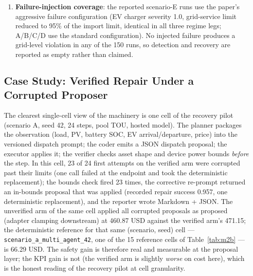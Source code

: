 \documentclass[11pt,a4paper]{article}
\begin{document}
\begin{enumerate}
    item of the authoring corpus (c07) passes because a Singapore weather
    file is resolvable in the environment
    (\texttt{data/weather\_files/singapore.csv}, 8{,}761 hourly rows in
    CityLearn format). That file is a synthetic tropical profile authored for
    this acceptance test, not measured data: no measured Singapore weather
    ships with the CityLearn datasets in this environment (each dataset
    carries one weather.csv). The item is reported as passing on synthetic
    data with the provenance disclosed in the artifact's README, and the
    authoring-acceptance coverage is all 8 domains accordingly; the weather
    token is a resolvable synthetic stand-in, not measured coverage.
    \item \textbf{Failure-injection coverage}: the reported scenario-E runs use the paper's aggressive failure configuration (EV charger severity 1.0, grid-service limit reduced to 95\% of the import limit, identical in all three regime legs; A/B/C/D use the standard configuration). No injected failure produces a grid-level violation in any of the 150 runs, so detection and recovery are reported as empty rather than claimed.
\end{enumerate}

\subsection{Case Study: Verified Repair Under a Corrupted Proposer}
\label{sec:case}

The clearest single-cell view of the machinery is one cell of the recovery
pilot (scenario A, seed 42, 24 steps, pool TOU, hosted model). The planner
packages the observation (load, PV, battery SOC, EV arrival/departure, price)
into the versioned dispatch prompt; the coder emits a JSON dispatch proposal;
the executor applies it; the verifier checks asset shape and device power
bounds \emph{before} the step. In this cell, 23 of 24 first attempts on the
verified arm were corrupted past their limits (one call failed at the endpoint
and took the deterministic replacement); the bounds check fired 23 times, the
corrective re-prompt returned an in-bounds proposal that was applied (recorded
repair success 0.957, one deterministic replacement), and the reporter wrote
Markdown + JSON. The unverified arm of the same cell applied all corrupted
proposals as proposed (adapter clamping downstream) at 460.87 USD against the
verified arm's 471.15; the deterministic reference for that same (scenario,
seed) cell --- \texttt{scenario\_a\_multi\_agent\_42}, one of the 15 reference
cells of Table~\ref{tab:m2b} --- is 66.29 USD. The safety gain is therefore
real and measurable at the proposal layer;
the KPI gain is not (the verified arm is slightly \emph{worse} on cost here),
which is the honest reading of the recovery pilot at cell granularity.
\end{document}
